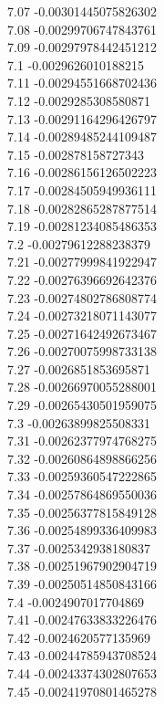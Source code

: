 {7.07	-0.00301445075826302\\
7.08	-0.00299706747843761\\
7.09	-0.00297978442451212\\
7.1	-0.0029626010188215\\
7.11	-0.00294551668702436\\
7.12	-0.0029285308580871\\
7.13	-0.00291164296426797\\
7.14	-0.00289485244109487\\
7.15	-0.002878158727343\\
7.16	-0.00286156126502223\\
7.17	-0.00284505949936111\\
7.18	-0.00282865287877514\\
7.19	-0.00281234085486353\\
7.2	-0.00279612288238379\\
7.21	-0.00277999841922947\\
7.22	-0.00276396692642376\\
7.23	-0.00274802786808774\\
7.24	-0.00273218071143077\\
7.25	-0.00271642492673467\\
7.26	-0.00270075998733138\\
7.27	-0.0026851853695871\\
7.28	-0.00266970055288001\\
7.29	-0.00265430501959075\\
7.3	-0.00263899825508331\\
7.31	-0.00262377974768275\\
7.32	-0.00260864898866256\\
7.33	-0.00259360547222865\\
7.34	-0.00257864869550036\\
7.35	-0.00256377815849128\\
7.36	-0.00254899336409983\\
7.37	-0.0025342938180837\\
7.38	-0.00251967902904719\\
7.39	-0.00250514850843166\\
7.4	-0.0024907017704869\\
7.41	-0.00247633833226476\\
7.42	-0.0024620577135969\\
7.43	-0.00244785943708524\\
7.44	-0.00243374302807653\\
7.45	-0.00241970801465278\\
}
